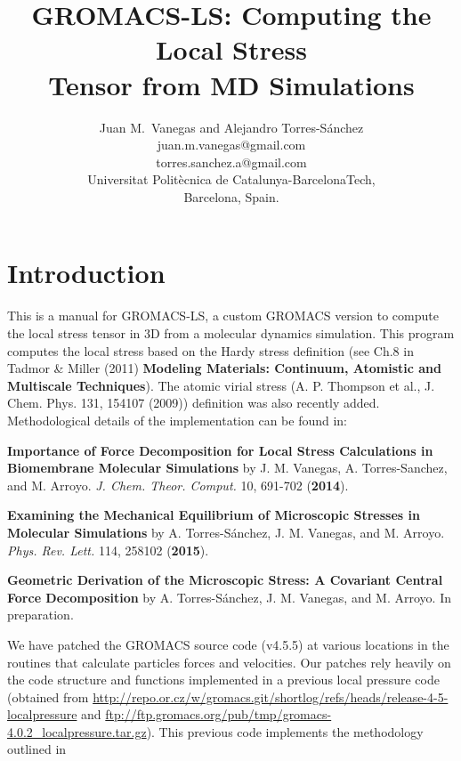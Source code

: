 \documentclass[10pt,letterpaper,notitlepage]{article}
\begin{document}
\title{GROMACS-LS: Computing the Local Stress\\Tensor from MD Simulations}
\author{Juan M.~Vanegas and Alejandro Torres-S\'anchez
\\juan.m.vanegas@gmail.com
\\torres.sanchez.a@gmail.com
\\Universitat Polit\`ecnica de Catalunya-BarcelonaTech, \\Barcelona, Spain.}
\maketitle

\section{Introduction}
This is a manual for GROMACS-LS, a custom GROMACS version to compute the local stress tensor in 3D from a molecular dynamics simulation. This program computes the local stress based on the Hardy stress definition (see Ch.8 in Tadmor \& Miller (2011) {\bf Modeling Materials: Continuum, Atomistic and Multiscale Techniques}). The atomic virial stress (A. P. Thompson et al., J. Chem. Phys. 131, 154107 (2009)) definition was also recently added. Methodological details of the implementation can be found in:

\textbf{Importance of Force Decomposition for Local Stress Calculations in Biomembrane Molecular Simulations} by J. M. Vanegas, A. Torres-Sanchez, and M. Arroyo. \emph{J. Chem. Theor. Comput.}  10, 691-702 (\textbf{2014}). 

\textbf{Examining the Mechanical Equilibrium of Microscopic Stresses in Molecular Simulations} by  A. Torres-S\'anchez, J. M. Vanegas, and M. Arroyo. \emph{Phys. Rev. Lett.} 114, 258102 (\textbf{2015}).

\textbf{Geometric Derivation of the Microscopic Stress: A Covariant Central Force Decomposition} by  A. Torres-S\'anchez, J. M. Vanegas, and M. Arroyo. In preparation.

We have patched the GROMACS source code (v4.5.5) at various locations in the routines that calculate particles forces and velocities. Our patches rely heavily on the code structure and functions implemented in a previous local pressure code (obtained from \url{http://repo.or.cz/w/gromacs.git/shortlog/refs/heads/release-4-5-localpressure} and \url{ftp://ftp.gromacs.org/pub/tmp/gromacs-4.0.2_localpressure.tar.gz}). This previous code implements the methodology outlined in
\end{document}

